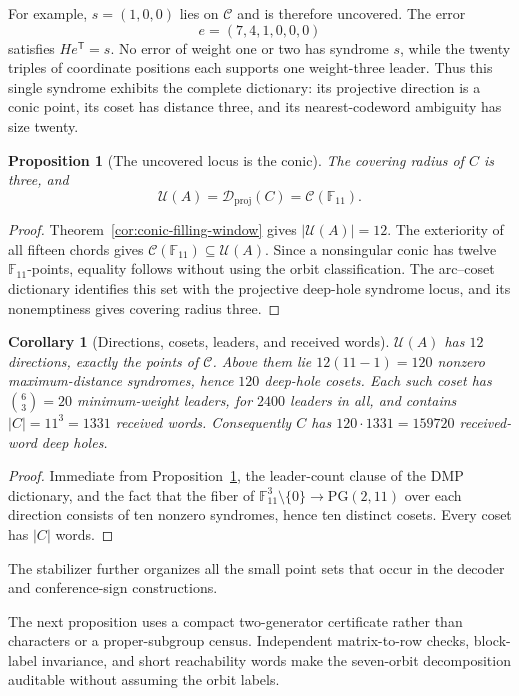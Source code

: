 \documentclass[11pt]{article}
\newtheorem{proposition}[theorem]{Proposition}
\newtheorem{corollary}[theorem]{Corollary}
\theoremstyle{definition}
\theoremstyle{remark}
\newcommand{\PG}{\mathrm{PG}}
\newcommand{\F}{\mathbb{F}}
\newcommand{\cC}{\mathcal{C}}
\newcommand{\cU}{\mathcal{U}}
\begin{document}
For example, $s=(1,0,0)$ lies on $\cC$ and is therefore uncovered.
The error
\[
 e=(7,4,1,0,0,0)
\]
satisfies $He^{\mathsf T}=s$.  No error of weight one or two has syndrome
$s$, while the twenty triples of coordinate positions each supports one
weight-three leader.  Thus this single syndrome exhibits the complete
dictionary: its projective direction is a conic point, its coset has
distance three, and its nearest-codeword ambiguity has size twenty.

\begin{proposition}[The uncovered locus is the conic]
\label{prop:deep-holes-conic}
The covering radius of $C$ is three, and
\[
 \cU(A)=\mathcal D_{\mathrm{proj}}(C)=\cC(\F_{11}).
\]
\end{proposition}

\begin{proof}
Theorem~\ref{cor:conic-filling-window} gives $|\cU(A)|=12$.
The exteriority of all fifteen chords gives
$\cC(\F_{11})\subseteq\cU(A)$. Since a nonsingular conic has twelve
$\F_{11}$-points, equality follows without using the orbit classification.
The arc--coset dictionary identifies this set with the projective deep-hole
syndrome locus, and its nonemptiness gives covering radius three.
\end{proof}

\begin{corollary}[Directions, cosets, leaders, and received words]
\label{cor:named-variety}
$\cU(A)$ has $12$ directions, exactly the points of $\cC$. Above them lie
$12(11-1)=120$ nonzero maximum-distance
syndromes, hence $120$ deep-hole cosets. Each such coset has
$\binom{6}{3}=20$ minimum-weight leaders, for $2400$ leaders in all, and
contains $|C|=11^3=1331$ received words. Consequently $C$ has
$120\cdot1331=159720$ received-word deep holes.
\end{corollary}

\begin{proof}
Immediate from Proposition~\ref{prop:deep-holes-conic}, the leader-count
clause of the DMP dictionary, and the fact that the fiber of
$\F_{11}^3\setminus\{0\}\to\PG(2,11)$ over each direction consists of ten
nonzero syndromes, hence ten distinct cosets. Every coset has $|C|$ words.
\end{proof}

The stabilizer further organizes all the small point sets that occur in the
decoder and conference-sign constructions.

The next proposition uses a compact two-generator certificate rather than
characters or a proper-subgroup census.  Independent matrix-to-row checks,
block-label invariance, and short reachability words make the seven-orbit
decomposition auditable without assuming the orbit labels.
\end{document}
